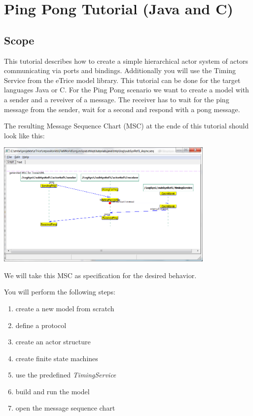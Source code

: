 \section{Ping Pong Tutorial (Java and C)}
\label{sec:ping_pong_tutorial}

\subsection{Scope}

This tutorial describes how to create a simple hierarchical actor system of actors communicating via ports and bindings. 
Additionally you will use the Timing Service from the eTrice model library.
This tutorial can be done for the target languages Java or C.
For the Ping Pong scenario we want to create a model with a sender and a reveiver of a message. The receiver has to wait for the ping message from the sender, wait for a second and respond with a pong message.

The resulting Message Sequence Chart (MSC) at the ende of this tutorial should look like this:

\includegraphics[width=0.8\textwidth]{images/017-01-MSC.png}

We will take this MSC as specification for the desired behavior.

You will perform the following steps:

\begin{enumerate}
\item create a new model from scratch
\item define a protocol
\item create an actor structure
\item create finite state machines
\item use the predefined \textit{TimingService}
\item build and run the model
\item open the message sequence chart
\end{enumerate}

